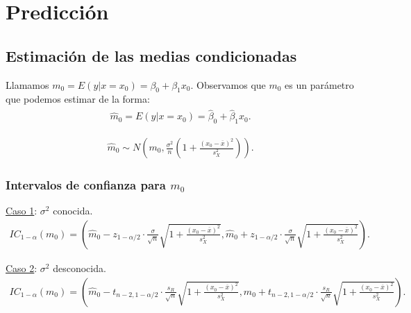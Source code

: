 \section{Predicción}

\subsection{Estimación de las medias condicionadas}
Llamamos $m_0 = E(y | x=x_0) = \beta_0 + \beta_1x_0$.
Observamos que $m_0$ es un parámetro que podemos estimar de la forma:
\begin{align*}
    \widehat{m}_0 = \widehat{E(y | x=x_0)} = \widehat{\beta}_0 + \widehat{\beta}_1x_0.
\end{align*}

\begin{teo}
    \begin{align*}
        \widehat{m}_0 \sim N\left( m_0, \frac{\sigma^2}{n} \left(1+\frac{(x_0-\overline{x})^2}{s_X^2}\right) \right).
    \end{align*}
\end{teo}

\subsubsection{Intervalos de confianza para $m_0$}
\underline{Caso 1}: $\sigma^2$ conocida.
\begin{align*}
    IC_{1-\alpha}(m_0) = \left( \widehat{m}_0 - z_{1-\alpha/2} \cdot \frac{\sigma}{\sqrt{n}} \sqrt{1 + \frac{(x_0 - \overline{x})^2}{s_X^2}}, \widehat{m}_0 + z_{1-\alpha/2} \cdot \frac{\sigma}{\sqrt{n}} \sqrt{1 + \frac{(x_0 - \overline{x})^2}{s_X^2}} \right).
\end{align*}

\underline{Caso 2}: $\sigma^2$ desconocida.
\begin{align*}
    IC_{1-\alpha}(m_0) = \left( \widehat{m}_0 - t_{n-2,1-\alpha/2} \cdot \frac{s_R}{\sqrt{n}} \sqrt{1 + \frac{(x_0 - \overline{x})^2}{s_X^2}}, \widehat{m}_0 + t_{n-2,1-\alpha/2} \cdot \frac{s_R}{\sqrt{n}} \sqrt{1 + \frac{(x_0 - \overline{x})^2}{s_X^2}} \right).
\end{align*}

